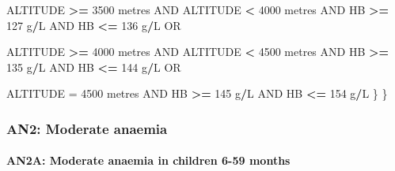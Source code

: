 \documentclass[12pt,a4paper]{article}
\newenvironment{Shaded}{\begin{snugshade}}{\end{snugshade}}
\newcommand{\DecValTok}[1]{\textcolor[rgb]{0.00,0.00,0.81}{#1}}
\newcommand{\NormalTok}[1]{#1}
\newcommand{\OperatorTok}[1]{\textcolor[rgb]{0.81,0.36,0.00}{\textbf{#1}}}
\newcommand{\StringTok}[1]{\textcolor[rgb]{0.31,0.60,0.02}{#1}}
\let\oldparagraph\paragraph
\renewcommand{\paragraph}[1]{\oldparagraph{#1}\mbox{}}
\begin{document}
\begin{Shaded}
\begin{Highlighting}[]
\NormalTok{        ALTITUDE }\OperatorTok{>=}\StringTok{ }\DecValTok{3500}\NormalTok{ metres AND ALTITUDE }\OperatorTok{<}\StringTok{ }\DecValTok{4000}\NormalTok{ metres AND  }
\NormalTok{          HB }\OperatorTok{>=}\StringTok{ }\DecValTok{127}\NormalTok{ g}\OperatorTok{/}\NormalTok{L AND HB }\OperatorTok{<=}\StringTok{ }\DecValTok{136}\NormalTok{ g}\OperatorTok{/}\NormalTok{L OR}
          
\NormalTok{        ALTITUDE }\OperatorTok{>=}\StringTok{ }\DecValTok{4000}\NormalTok{ metres AND ALTITUDE }\OperatorTok{<}\StringTok{ }\DecValTok{4500}\NormalTok{ metres AND}
\NormalTok{          HB }\OperatorTok{>=}\StringTok{ }\DecValTok{135}\NormalTok{ g}\OperatorTok{/}\NormalTok{L AND HB }\OperatorTok{<=}\StringTok{ }\DecValTok{144}\NormalTok{ g}\OperatorTok{/}\NormalTok{L OR}

\NormalTok{        ALTITUDE =}\StringTok{ }\DecValTok{4500}\NormalTok{ metres AND HB }\OperatorTok{>=}\StringTok{ }\DecValTok{145}\NormalTok{ g}\OperatorTok{/}\NormalTok{L AND HB }\OperatorTok{<=}\StringTok{ }\DecValTok{154}\NormalTok{ g}\OperatorTok{/}\NormalTok{L}
\NormalTok{    \}}
\NormalTok{  \}}
\end{Highlighting}
\end{Shaded}

\newpage

\hypertarget{an2-moderate-anaemia}{%
\subsubsection{AN2: Moderate anaemia}\label{an2-moderate-anaemia}}

\hypertarget{an2a-moderate-anaemia-in-children-6-59-months}{%
\paragraph{AN2A: Moderate anaemia in children 6-59 months}\label{an2a-moderate-anaemia-in-children-6-59-months}}
\end{document}
